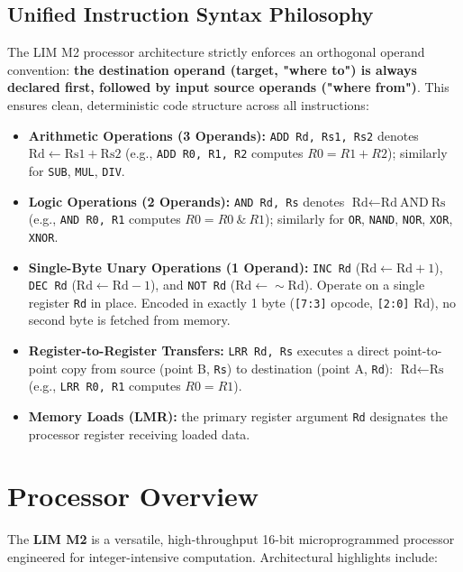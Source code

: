 \documentclass[11pt,a4paper]{article}
\newcommand{\reg}[1]{\texttt{#1}}
\begin{document}
\subsection{Unified Instruction Syntax Philosophy}
The LIM M2 processor architecture strictly enforces an orthogonal operand convention: \textbf{the destination operand (target, "where to") is always declared first, followed by input source operands ("where from")}. This ensures clean, deterministic code structure across all instructions:
\begin{itemize}
  \item \textbf{Arithmetic Operations (3 Operands):} \texttt{ADD Rd, Rs1, Rs2} denotes $\text{Rd} \leftarrow \text{Rs1} + \text{Rs2}$ (e.g., \texttt{ADD R0, R1, R2} computes $R0 = R1 + R2$); similarly for \texttt{SUB}, \texttt{MUL}, \texttt{DIV}.
  \item \textbf{Logic Operations (2 Operands):} \texttt{AND Rd, Rs} denotes $\text{Rd} \leftarrow \text{Rd} \ \text{AND}\ \text{Rs}$ (e.g., \texttt{AND R0, R1} computes $R0 = R0 \ \& \ R1$); similarly for \texttt{OR}, \texttt{NAND}, \texttt{NOR}, \texttt{XOR}, \texttt{XNOR}.
  \item \textbf{Single-Byte Unary Operations (1 Operand):} \texttt{INC Rd} ($\text{Rd} \leftarrow \text{Rd} + 1$), \texttt{DEC Rd} ($\text{Rd} \leftarrow \text{Rd} - 1$), and \texttt{NOT Rd} ($\text{Rd} \leftarrow \sim\text{Rd}$). Operate on a single register \reg{Rd} in place. Encoded in exactly 1 byte (\texttt{[7:3]} opcode, \texttt{[2:0]} Rd), no second byte is fetched from memory.
  \item \textbf{Register-to-Register Transfers:} \texttt{LRR Rd, Rs} executes a direct point-to-point copy from source (point B, \reg{Rs}) to destination (point A, \reg{Rd}): $\text{Rd} \leftarrow \text{Rs}$ (e.g., \texttt{LRR R0, R1} computes $R0 = R1$).
  \item \textbf{Memory Loads (LMR):} the primary register argument \reg{Rd} designates the processor register receiving loaded data.
\end{itemize}

\section{Processor Overview}
The \textbf{LIM M2} is a versatile, high-throughput 16-bit microprogrammed processor engineered for integer-intensive computation. Architectural highlights include:
\end{document}
